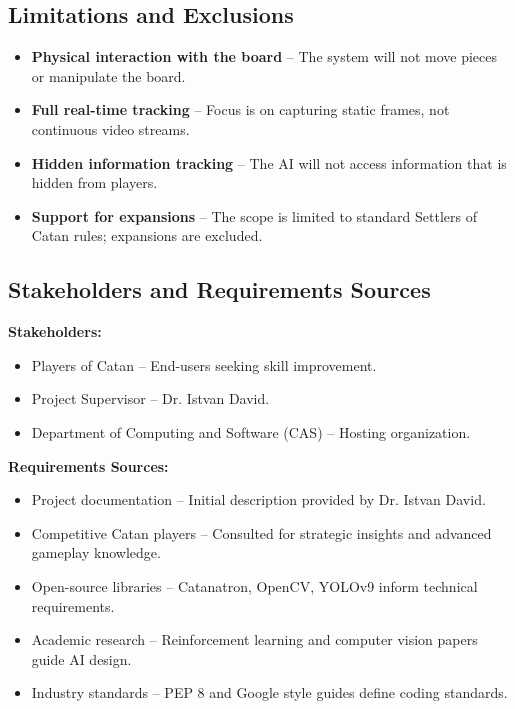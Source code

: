 \documentclass{article}
\begin{document}
\subsection{Limitations and Exclusions}\label{subsec:limitations-and-exclusions}
\begin{itemize}
    \item \textbf{Physical interaction with the board} – The system will not move pieces or manipulate the board.
    \item \textbf{Full real-time tracking} – Focus is on capturing static frames, not continuous video streams.
    \item \textbf{Hidden information tracking} – The AI will not access information that is hidden from players.
    \item \textbf{Support for expansions} – The scope is limited to standard Settlers of Catan rules; expansions are excluded.
\end{itemize}

\subsection{Stakeholders and Requirements Sources}\label{subsec:stakeholders-and-requirements-sources}
\textbf{Stakeholders:}
\begin{itemize}
    \item Players of Catan – End-users seeking skill improvement.
    \item Project Supervisor – Dr. Istvan David.
    \item Department of Computing and Software (CAS) – Hosting organization.
\end{itemize}

\textbf{Requirements Sources:}
\begin{itemize}
    \item Project documentation – Initial description provided by Dr. Istvan David.
    \item Competitive Catan players – Consulted for strategic insights and advanced gameplay knowledge.
    \item Open-source libraries – Catanatron, OpenCV, YOLOv9 inform technical requirements.
    \item Academic research – Reinforcement learning and computer vision papers guide AI design.
    \item Industry standards – PEP 8 and Google style guides define coding standards.
\end{itemize}
\end{document}
